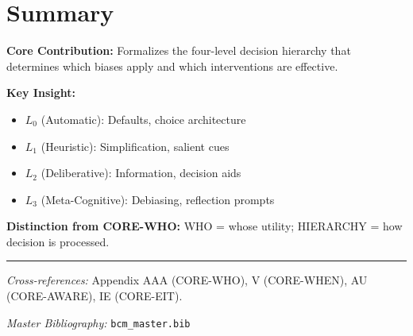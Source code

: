 \section{Summary}

\begin{tcolorbox}[colback=gray!5!white, colframe=gray!75!black,
    title=Appendix HI Summary: CORE-HIERARCHY]

\textbf{Core Contribution:}
Formalizes the four-level decision hierarchy that determines which biases
apply and which interventions are effective.

\textbf{Key Insight:}
\begin{itemize}[nosep]
\item $L_0$ (Automatic): Defaults, choice architecture
\item $L_1$ (Heuristic): Simplification, salient cues
\item $L_2$ (Deliberative): Information, decision aids
\item $L_3$ (Meta-Cognitive): Debiasing, reflection prompts
\end{itemize}

\textbf{Distinction from CORE-WHO:}
WHO = whose utility; HIERARCHY = how decision is processed.

\end{tcolorbox}

\vspace{1em}
\hrule
\vspace{0.5em}

\noindent\textit{Cross-references:}
Appendix AAA (CORE-WHO), V (CORE-WHEN), AU (CORE-AWARE), IE (CORE-EIT).

\noindent\textit{Master Bibliography:} \texttt{bcm\_master.bib}

\nocite{bcm_master}

